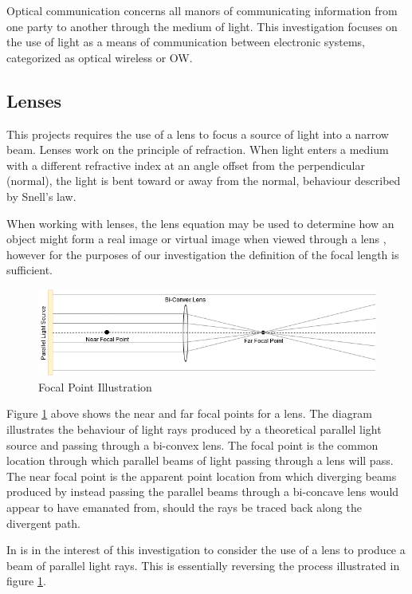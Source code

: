 Optical communication concerns all manors of communicating information from one party to another through the medium of light. This investigation focuses on the use of light as a means of communication between electronic systems, categorized as optical wireless or OW.

\subsection{Lenses}
This projects requires the use of a lens to focus a source of light into a narrow beam. Lenses work on the principle of refraction. When light enters a medium with a different refractive index at an angle offset from the perpendicular (normal), the light is bent toward or away from the normal, behaviour described by Snell's law.

When working with lenses, the lens equation may be used to determine how an object might form a real image or virtual image when viewed through a lens \cite{Knight2013}, however for the purposes of our investigation the definition of the focal length is sufficient.

\begin{figure}[H]
	\centering
	\includegraphics[width=0.8\linewidth]{figures/litreview/lens_diagram.png}
	\caption{Focal Point Illustration}
	\label{fig:lens_diagram}
\end{figure}

Figure \ref{fig:lens_diagram} above shows the near and far focal points for a lens. The diagram illustrates the behaviour of light rays produced by a theoretical parallel light source and passing through a bi-convex lens. The focal point is the common location through which parallel beams of light passing through a lens will pass. The near focal point is the apparent point location from which diverging beams produced by instead passing the parallel beams through a bi-concave lens would appear to have emanated from, should the rays be traced back along the divergent path.

In is in the interest of this investigation to consider the use of a lens to produce a beam of parallel light rays. This is essentially reversing the process illustrated in figure \ref{fig:lens_diagram}.

